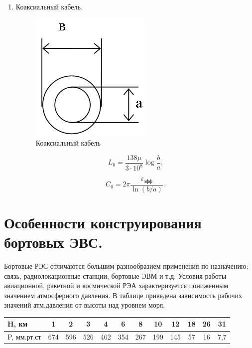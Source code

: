 \documentclass[unicode, 12pt, a4paper, oneside]{article}
\begin{document}
\begin{enumerate}
\item Коаксиальный кабель.\nopagebreak

\begin{minipage}{\linewidth}
	\begin{figure}
	\centering
	\includegraphics[width=0.4\linewidth]{71_koaksial.png}
	\caption{Коаксиальный кабель}
	\end{figure}
	
	\begin{equation}
	L_0 = \dfrac{138\mu}{3 \cdot 10^8} \log\dfrac{b}{a}.
	\end{equation}\vspace{\parsep}

	\begin{equation}
	C_0 = 2\pi \dfrac{\varepsilon_\text{эфф}}{\ln(b/a)}.
	\end{equation}
\end{minipage}
\vspace{1em}

\end{enumerate}


\section{Особенности конструирования бортовых ЭВС.}

Бортовые РЭС отличаются большим разнообразием применения по назначению: связь, радиолокационные станции, бортовые ЭВМ и т.д. Условия работы авиационной, ракетной и космической РЭА характеризуется пониженным значением атмосферного давления. В таблице приведена зависимость рабочих значений атм.давления от высоты над уровнем моря.

\begin{center}
\begin{tabular}{|l|c|c|c|c|c|c|c|c|c|c|c|}
\hline
H, км		& 1		& 2		& 3		& 4		& 6		& 8		& 10	& 12	& 18	& 26	& 31	\\ \hline
P, мм.рт.ст	& 674	& 596	& 526	& 462	& 354	& 267	& 199	& 145	& 57	& 16	& 7,7	\\ \hline
\end{tabular}
\end{center}
\end{document}

